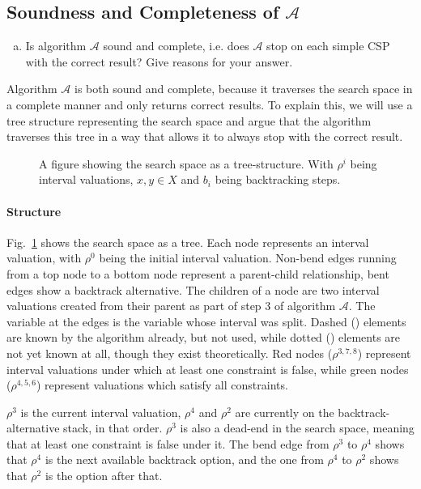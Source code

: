 \subsection{Soundness and Completeness of $\mathcal{A}$}
\begin{enumerate}[(b)]
\item Is algorithm $\mathcal{A}$ sound and complete, i.e. does $\mathcal{A}$ stop on each simple CSP with the correct result? Give reasons for your answer.
\end{enumerate}

Algorithm $\mathcal{A}$ is both sound and complete, because it traverses the search space in a complete manner and only returns correct results.
To explain this, we will use a tree structure representing the search space and argue that the algorithm traverses this tree in a way that allows it to always stop with the correct result.

\begin{figure}[H]
    \centering
    
    \caption{
        A figure showing the search space as a tree-structure.
        With $\rho^i$ being interval valuations, $x, y \in X$ and $b_i$ being backtracking steps.
    }
    \label{fig:search-tree}
\end{figure}


\paragraph{Structure}
Fig.~\ref{fig:search-tree} shows the search space as a tree.
Each node represents an interval valuation, with $\rho^0$ being the initial interval valuation.
Non-bend edges running from a top node to a bottom node represent a parent-child relationship, bent edges show a backtrack alternative.
The children of a node are two interval valuations created from their parent as part of step 3 of algorithm $\mathcal{A}$.
The variable at the edges is the variable whose interval was split.
Dashed (\dashed) elements are known by the algorithm already, but not used, while dotted (\dotted) elements are not yet known at all, though they exist theoretically.
Red nodes ($\rho^{3,7,8}$) represent interval valuations under which at least one constraint is false, while green nodes ($\rho^{4,5,6}$) represent valuations which satisfy all constraints.

$\rho^3$ is the current interval valuation, $\rho^4$ and $\rho^2$ are currently on the backtrack-alternative stack, in that order.
$\rho^3$ is also a dead-end in the search space, meaning that at least one constraint is false under it.
The bend edge from $\rho^3$ to $\rho^4$ shows that $\rho^4$ is the next available backtrack option, and the one from $\rho^4$ to $\rho^2$ shows that $\rho^2$ is the option after that.

